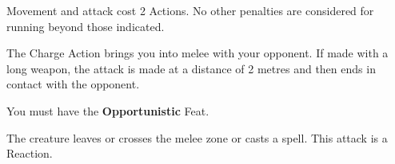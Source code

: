 \documentclass[landscape,10pt,a4paper]{article}
\begin{document}
\begin{multicols}{3}
\begin{dmbox}[title=Charge - page \pageref{charge}]
Movement and attack cost 2 Actions. No other penalties are considered for running beyond those indicated.

The Charge Action brings you into melee with your opponent. If made with a long weapon, the attack is made at a distance of 2 metres and then ends in contact with the opponent.
\end{dmbox}

\begin{dmbox}[title=Opportunity Attack - page \pageref{attaccoopportunita}]
You must have the \textbf{Opportunistic} Feat.

The creature leaves or crosses the melee zone or casts a spell. This attack is a Reaction.
\end{dmbox}

\begin{dmbox}[title=Actions per Round - page \pageref{actionsintheround}]


\end{dmbox}
\end{multicols}
\end{document}
